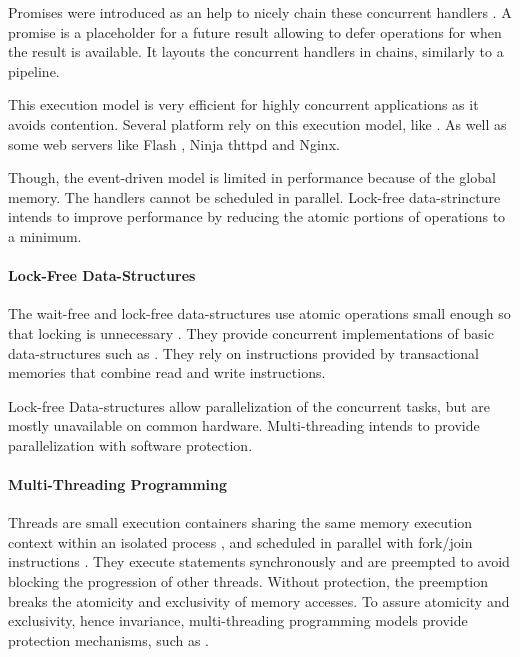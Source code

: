 Promises were introduced as an help to nicely chain these concurrent handlers \cite{Liskov1988}.
A promise is a placeholder for a future result allowing to defer operations for when the result is available.
It layouts the concurrent handlers in chains, similarly to a pipeline.

This execution model is very efficient for highly concurrent applications as it avoids contention.
Several platform rely on this execution model, like .
As well as some web servers like Flash \cite{Pai1999}, Ninja \cite{Gribble2001} thttpd and Nginx.

Though, the event-driven model is limited in performance because of the global memory.
The handlers cannot be scheduled in parallel.
Lock-free data-strincture intends to improve performance by reducing the atomic portions of operations to a minimum.

\paragraph{Lock-Free Data-Structures}

The wait-free and lock-free data-structures use atomic operations small enough so that locking is unnecessary \cite{Lamport1977,Herlihy1988,Herlihy1990,Herlihy1991,Anderson1990}.
They provide concurrent implementations of basic data-structures such as .
They rely on instructions provided by transactional memories \cite{Harris2010} that combine read and write instructions.

Lock-free Data-structures allow parallelization of the concurrent tasks, but are mostly unavailable on common hardware.
Multi-threading intends to provide parallelization with software protection.

\paragraph{Multi-Threading Programming}

Threads are small execution containers sharing the same memory execution context within an isolated process \cite{Dijkstra1968}, and scheduled in parallel with fork/join instructions \cite{Randall1998,Frigo1998,Leiserson2010}.
They execute statements synchronously and are preempted to avoid blocking the progression of other threads.
Without protection, the preemption breaks the atomicity and exclusivity of memory accesses.
To assure atomicity and exclusivity, hence invariance, multi-threading programming models provide protection mechanisms, such as .

